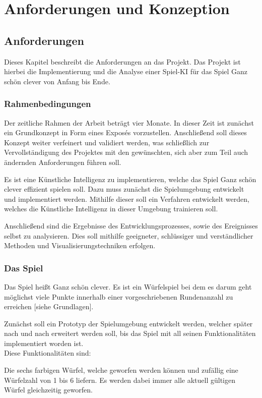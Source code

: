 \section{Anforderungen und Konzeption}
\subsection{Anforderungen}
Dieses Kapitel beschreibt die Anforderungen an das Projekt. Das Projekt ist hierbei die Implementierung und die Analyse einer Spiel-KI für das Spiel Ganz schön clever von Anfang bis Ende.
\subsubsection{Rahmenbedingungen}
Der zeitliche Rahmen der Arbeit beträgt vier Monate. In dieser Zeit ist zunächst ein Grundkonzept in Form eines Exposés vorzustellen. Anschließend soll dieses Konzept weiter verfeinert und validiert werden, was schließlich zur Vervollständigung des Projektes mit den gewünschten, sich aber zum Teil auch ändernden Anforderungen führen soll. 

Es ist eine Künstliche Intelligenz zu implementieren, welche das Spiel Ganz schön clever effizient spielen soll. Dazu muss zunächst die Spielumgebung entwickelt und implementiert werden. Mithilfe dieser soll ein Verfahren entwickelt werden, welches die Künstliche Intelligenz in dieser Umgebung trainieren soll.

Anschließend sind die Ergebnisse des Entwicklungsprozesses, sowie des Ereignisses selbst zu analysieren. Dies soll mithilfe geeigneter, schlüssiger und verständlicher Methoden und Visualisierungstechniken erfolgen.
\subsubsection{Das Spiel}
Das Spiel heißt Ganz schön clever. Es ist ein Würfelspiel bei dem es darum geht möglichst viele Punkte innerhalb einer vorgeschriebenen Rundenanzahl zu erreichen [siehe Grundlagen].

Zunächst soll ein Prototyp der Spielumgebung entwickelt werden, welcher später nach und nach erweitert werden soll, bis das Spiel mit all seinen Funktionalitäten implementiert worden ist.\\

Diese Funktionalitäten sind:

Die sechs farbigen Würfel, welche geworfen werden können und zufällig eine Würfelzahl von 1 bis 6 liefern. Es werden dabei immer alle aktuell gültigen Würfel gleichzeitig geworfen.


